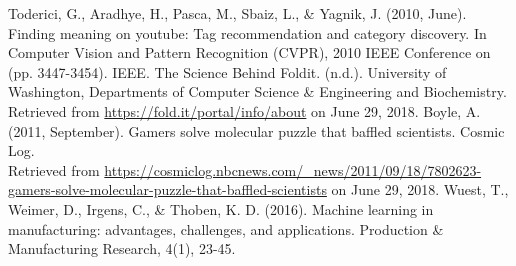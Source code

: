 \documentclass[conference]{IEEEtran}
\begin{document}
\begin{thebibliography}{1}
    Toderici, G., Aradhye, H., Pasca, M., Sbaiz, L., \& Yagnik, J. (2010, June). Finding meaning on youtube: Tag recommendation and category discovery. In Computer Vision and Pattern Recognition (CVPR), 2010 IEEE Conference on (pp. 3447-3454). IEEE.
    The Science Behind Foldit. (n.d.). University of Washington, Departments of Computer Science \& Engineering and Biochemistry. Retrieved from \url{https://fold.it/portal/info/about} on June 29, 2018. 
    Boyle, A. (2011, September). Gamers solve molecular puzzle that baffled scientists. Cosmic Log.\\
    Retrieved from \url{https://cosmiclog.nbcnews.com/_news/2011/09/18/7802623-gamers-solve-molecular-puzzle-that-baffled-scientists} on June 29, 2018.
    Wuest, T., Weimer, D., Irgens, C., \& Thoben, K. D. (2016). Machine learning in manufacturing: advantages, challenges, and applications. Production \& Manufacturing Research, 4(1), 23-45.
\end{thebibliography}
\end{document}
